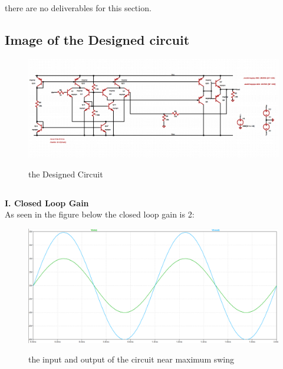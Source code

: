 \documentclass[11pt]{article}
\begin{document}
\subsection{} there are no deliverables for this section.
\subsection{Image of the Designed circuit}
\begin{figure}[H]
    \begin{center}
        \includegraphics[scale=0.45]{Fig/circuitDesignn.png}
        \label{fig:designedCircuit}
        \caption{the Designed Circuit}
    \end{center}
\end{figure}

\subsection{}

\textbf{I. Closed Loop Gain}\\
As seen in the figure below the closed loop gain is 2: \\
\begin{figure}[H]
    \begin{center}
        \includegraphics[scale=0.45]{Fig/gain.png}
        \label{fig:gain}
        \caption{the input and output of the circuit near maximum swing}
    \end{center}
\end{figure}
\end{document}
